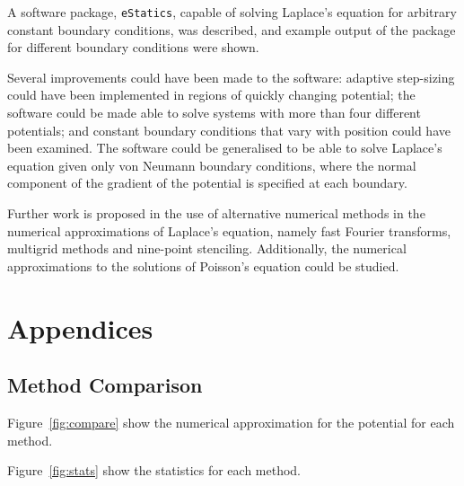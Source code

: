 \documentclass[11pt, a4paper]{article}
\begin{document}
A software package, \lstinline|eStatics|, capable of solving Laplace's equation for
arbitrary constant boundary conditions, was described, and example output of the
package for different boundary conditions were shown.

Several improvements could have been made to the software: adaptive step-sizing could
have been implemented in regions of quickly changing potential; the software could be
made able to solve systems with more than four different potentials; and constant boundary
conditions that vary with position could have been examined. The software could be
generalised to be able to solve Laplace's equation given only von Neumann boundary
conditions, where the normal component of the gradient of the potential is specified
at each boundary. 

Further work is proposed in the use of alternative numerical methods in the
numerical approximations of Laplace's equation, namely fast Fourier transforms,
multigrid methods and nine-point stenciling. Additionally, the numerical approximations
to the solutions of Poisson's equation could be studied.



\appendix
\section{Appendices}

\subsection{Method Comparison}
\label{app:compare}
Figure~\ref{fig:compare} show the numerical approximation for the potential for each
method.


Figure~\ref{fig:stats} show the statistics for each method.
\end{document}
